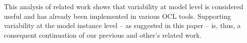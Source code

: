 This analysis of related work shows that variability at model level is
considered useful and has already been implemented in various OCL tools.
Supporting variability at the model instance level -- as suggested in this paper -- 
is, thus, a consequent continuation of our previous
and other's related work.



% 
% 
% 
